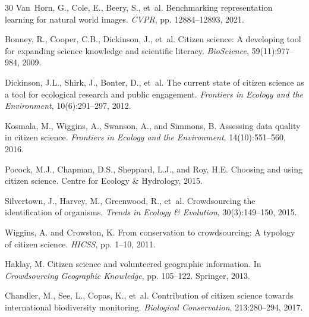 \begin{thebibliography}{30}
Van~Horn, G., Cole, E., Beery, S., et~al.
\newblock Benchmarking representation learning for natural world images.
\newblock \emph{CVPR}, pp. 12884--12893, 2021.

Bonney, R., Cooper, C.B., Dickinson, J., et~al.
\newblock Citizen science: A developing tool for expanding science knowledge
  and scientific literacy.
\newblock \emph{BioScience}, 59(11):977--984, 2009.

Dickinson, J.L., Shirk, J., Bonter, D., et~al.
\newblock The current state of citizen science as a tool for ecological
  research and public engagement.
\newblock \emph{Frontiers in Ecology and the Environment}, 10(6):291--297, 2012.

Kosmala, M., Wiggins, A., Swanson, A., and Simmons, B.
\newblock Assessing data quality in citizen science.
\newblock \emph{Frontiers in Ecology and the Environment}, 14(10):551--560, 2016.

Pocock, M.J., Chapman, D.S., Sheppard, L.J., and Roy, H.E.
\newblock Choosing and using citizen science.
\newblock Centre for Ecology \& Hydrology, 2015.

Silvertown, J., Harvey, M., Greenwood, R., et~al.
\newblock Crowdsourcing the identification of organisms.
\newblock \emph{Trends in Ecology \& Evolution}, 30(3):149--150, 2015.

Wiggins, A. and Crowston, K.
\newblock From conservation to crowdsourcing: A typology of citizen science.
\newblock \emph{HICSS}, pp. 1--10, 2011.

Haklay, M.
\newblock Citizen science and volunteered geographic information.
\newblock In \emph{Crowdsourcing Geographic Knowledge}, pp. 105--122.
  Springer, 2013.

Chandler, M., See, L., Copas, K., et~al.
\newblock Contribution of citizen science towards international biodiversity
  monitoring.
\newblock \emph{Biological Conservation}, 213:280--294, 2017.

\end{thebibliography}

